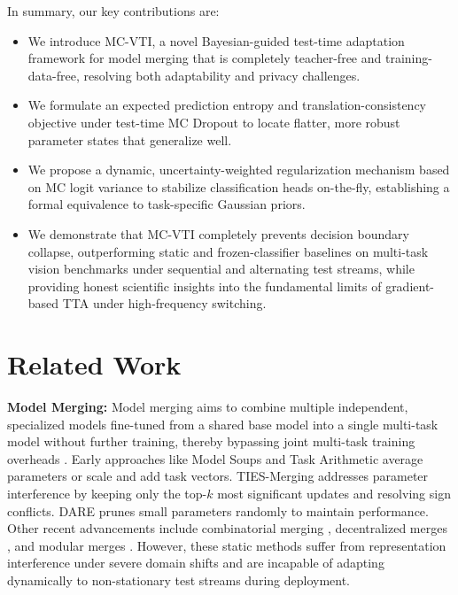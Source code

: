 \documentclass{article}
\theoremstyle{plain}
\theoremstyle{definition}
\theoremstyle{remark}
\begin{document}
In summary, our key contributions are:
\begin{itemize}
  \item We introduce MC-VTI, a novel Bayesian-guided test-time adaptation framework for model merging that is completely teacher-free and training-data-free, resolving both adaptability and privacy challenges.
  \item We formulate an expected prediction entropy and translation-consistency objective under test-time MC Dropout to locate flatter, more robust parameter states that generalize well.
  \item We propose a dynamic, uncertainty-weighted regularization mechanism based on MC logit variance to stabilize classification heads on-the-fly, establishing a formal equivalence to task-specific Gaussian priors.
  \item We demonstrate that MC-VTI completely prevents decision boundary collapse, outperforming static and frozen-classifier baselines on multi-task vision benchmarks under sequential and alternating test streams, while providing honest scientific insights into the fundamental limits of gradient-based TTA under high-frequency switching.
\end{itemize}

\section{Related Work}
\label{sec:related}
\textbf{Model Merging:} Model merging aims to combine multiple independent, specialized models fine-tuned from a shared base model into a single multi-task model without further training, thereby bypassing joint multi-task training overheads \cite{wortsman2022model,ilharco2023editing,yadav2023ties,yu2024language}. Early approaches like Model Soups \cite{wortsman2022model} and Task Arithmetic \cite{ilharco2023editing} average parameters or scale and add task vectors. TIES-Merging \cite{yadav2023ties} addresses parameter interference by keeping only the top-$k$ most significant updates and resolving sign conflicts. DARE \cite{yu2024language} prunes small parameters randomly to maintain performance. Other recent advancements include combinatorial merging \cite{slimi2024combinatorial}, decentralized merges \cite{saadati2024decentralized}, and modular merges \cite{ladwig2023modular}. However, these static methods suffer from representation interference under severe domain shifts and are incapable of adapting dynamically to non-stationary test streams during deployment.
\end{document}

